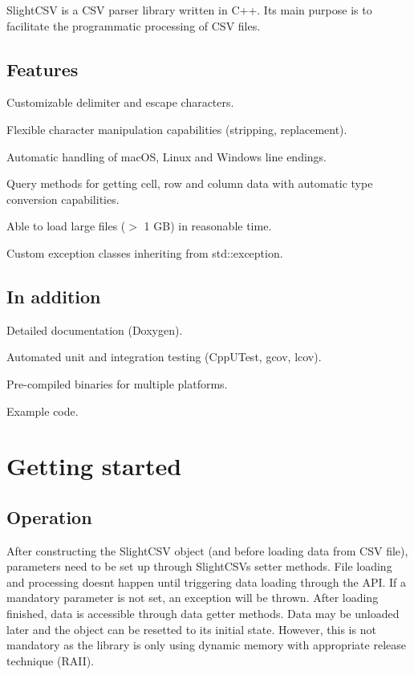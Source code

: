 Slight\+C\+SV is a C\+SV parser library written in C++. Its main purpose is to facilitate the programmatic processing of C\+SV files.

\subsection*{Features}


\begin{DoxyItemize}
\item Customizable delimiter and escape characters.
\item Flexible character manipulation capabilities (stripping, replacement).
\item Automatic handling of mac\+OS, Linux and Windows line endings.
\item Query methods for getting cell, row and column data with automatic type conversion capabilities.
\item Able to load large files ($>$ 1 GB) in reasonable time.
\item Custom exception classes inheriting from std\+::exception.
\end{DoxyItemize}

\subsection*{In addition}


\begin{DoxyItemize}
\item Detailed documentation (Doxygen).
\item Automated unit and integration testing (Cpp\+U\+Test, gcov, lcov).
\item Pre-\/compiled binaries for multiple platforms.
\item Example code.
\end{DoxyItemize}

\section*{Getting started}

\subsection*{Operation}

After constructing the Slight\+C\+SV object (and before loading data from C\+SV file), parameters need to be set up through Slight\+C\+SV\textquotesingle{}s setter methods. File loading and processing doesn\textquotesingle{}t happen until triggering data loading through the A\+PI. If a mandatory parameter is not set, an exception will be thrown. After loading finished, data is accessible through data getter methods. Data may be unloaded later and the object can be resetted to its initial state. However, this is not mandatory as the library is only using dynamic memory with appropriate release technique (R\+A\+II).

